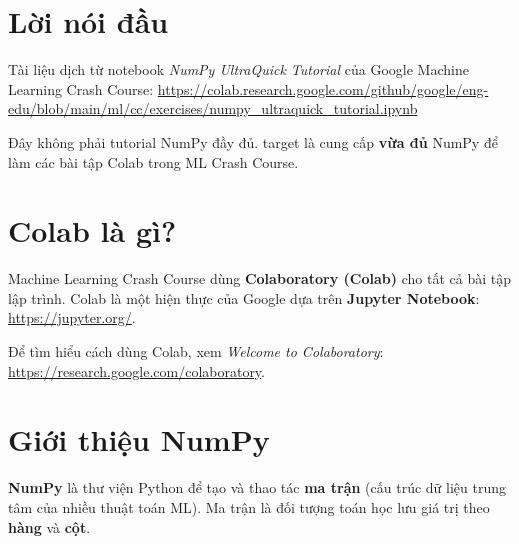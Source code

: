 \documentclass[12pt,a4paper]{article}
\newcommand{\mlccurl}[1]{\url{#1}}
\begin{document}

\newpage
\tableofcontents
\newpage

\section*{Lời nói đầu}

\begin{ynghia}[title={Nguồn}]
Tài liệu dịch từ notebook \textit{NumPy UltraQuick Tutorial} của Google Machine Learning Crash Course:
\mlccurl{https://colab.research.google.com/github/google/eng-edu/blob/main/ml/cc/exercises/numpy_ultraquick_tutorial.ipynb}
\end{ynghia}

\begin{luuy}[title={target}]
Đây không phải tutorial NumPy đầy đủ. target là cung cấp \textbf{vừa đủ} NumPy để làm các bài tập Colab trong ML Crash Course.
\end{luuy}

\newpage

\section{Colab là gì?}

\begin{dinhnghia}[title={Colaboratory (Colab)}]
Machine Learning Crash Course dùng \textbf{Colaboratory (Colab)} cho tất cả bài tập lập trình.
Colab là một hiện thực của Google dựa trên \textbf{Jupyter Notebook}:
\mlccurl{https://jupyter.org/}.

Để tìm hiểu cách dùng Colab, xem \textit{Welcome to Colaboratory}:
\mlccurl{https://research.google.com/colaboratory}.
\end{dinhnghia}

\section{Giới thiệu NumPy}

\begin{dongco}[title={Vì sao cần NumPy?}]
\textbf{NumPy} là thư viện Python để tạo và thao tác \textbf{ma trận} (cấu trúc dữ liệu trung tâm của nhiều thuật toán ML).
Ma trận là đối tượng toán học lưu giá trị theo \textbf{hàng} và \textbf{cột}.
\end{dongco}
\end{document}

